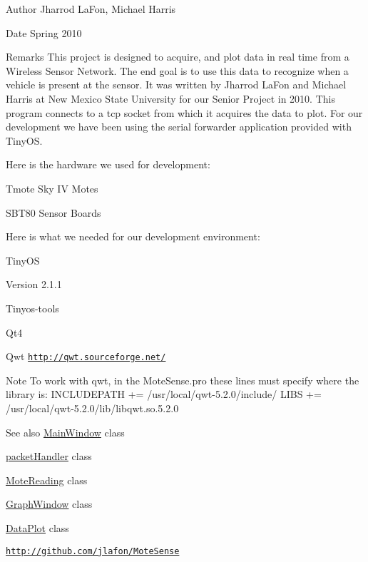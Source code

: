 \begin{DoxyAuthor}{Author}
Jharrod LaFon, Michael Harris 
\end{DoxyAuthor}
\begin{DoxyDate}{Date}
Spring 2010
\end{DoxyDate}
\begin{DoxyRemark}{Remarks}
This project is designed to acquire, and plot data in real time from a Wireless Sensor Network. The end goal is to use this data to recognize when a vehicle is present at the sensor. It was written by Jharrod LaFon and Michael Harris at New Mexico State University for our Senior Project in 2010. This program connects to a tcp socket from which it acquires the data to plot. For our development we have been using the serial forwarder application provided with TinyOS. 
\end{DoxyRemark}


Here is the hardware we used for development:
\begin{DoxyItemize}
\item Tmote Sky IV Motes
\item SBT80 Sensor Boards
\end{DoxyItemize}

Here is what we needed for our development environment:
\begin{DoxyItemize}
\item TinyOS
\begin{DoxyEnumerate}
\item Version 2.1.1
\end{DoxyEnumerate}
\item Tinyos-\/tools
\item Qt4
\item Qwt \href{http://qwt.sourceforge.net/}{\tt http://qwt.sourceforge.net/}
\end{DoxyItemize}

\begin{DoxyNote}{Note}
To work with qwt, in the MoteSense.pro these lines must specify where the library is: INCLUDEPATH += /usr/local/qwt-\/5.2.0/include/ LIBS += /usr/local/qwt-\/5.2.0/lib/libqwt.so.5.2.0 
\end{DoxyNote}
\begin{DoxySeeAlso}{See also}
\hyperlink{classMainWindow}{MainWindow} class 

\hyperlink{classpacketHandler}{packetHandler} class 

\hyperlink{classMoteReading}{MoteReading} class 

\hyperlink{classGraphWindow}{GraphWindow} class 

\hyperlink{classDataPlot}{DataPlot} class 

\href{http://github.com/jlafon/MoteSense}{\tt http://github.com/jlafon/MoteSense} 
\end{DoxySeeAlso}
